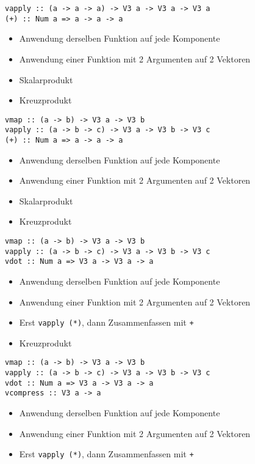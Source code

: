 \documentclass{beamer}
\begin{document}
\begin{frame}[fragile]
\begin{overprint}
\begin{verbatim}
vapply :: (a -> a -> a) -> V3 a -> V3 a -> V3 a
(+) :: Num a => a -> a -> a
\end{verbatim}
\begin{itemize}
 \item Anwendung derselben Funktion auf jede Komponente
 \item Anwendung einer Funktion mit 2 Argumenten auf 2 Vektoren
 \item Skalarprodukt
 \item Kreuzprodukt
\end{itemize}
\begin{verbatim}
vmap :: (a -> b) -> V3 a -> V3 b
vapply :: (a -> b -> c) -> V3 a -> V3 b -> V3 c
(+) :: Num a => a -> a -> a
\end{verbatim}
\begin{itemize}
 \item Anwendung derselben Funktion auf jede Komponente
 \item Anwendung einer Funktion mit 2 Argumenten auf 2 Vektoren
 \item Skalarprodukt
 \item Kreuzprodukt
\end{itemize}
\begin{verbatim}
vmap :: (a -> b) -> V3 a -> V3 b
vapply :: (a -> b -> c) -> V3 a -> V3 b -> V3 c
vdot :: Num a => V3 a -> V3 a -> a
\end{verbatim}
\begin{itemize}
 \item Anwendung derselben Funktion auf jede Komponente
 \item Anwendung einer Funktion mit 2 Argumenten auf 2 Vektoren
 \item Erst \texttt{vapply (*)}, dann Zusammenfassen mit \texttt{+}
 \item Kreuzprodukt
\end{itemize}
\begin{verbatim}
vmap :: (a -> b) -> V3 a -> V3 b
vapply :: (a -> b -> c) -> V3 a -> V3 b -> V3 c
vdot :: Num a => V3 a -> V3 a -> a
vcompress :: V3 a -> a
\end{verbatim}
\begin{itemize}
 \item Anwendung derselben Funktion auf jede Komponente
 \item Anwendung einer Funktion mit 2 Argumenten auf 2 Vektoren
 \item Erst \texttt{vapply (*)}, dann Zusammenfassen mit \texttt{+}

\end{itemize}
\end{overprint}
\end{frame}
\end{document}
